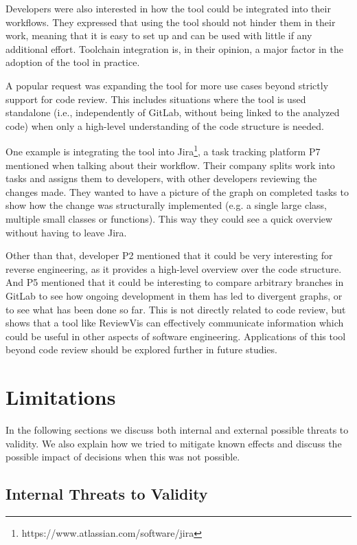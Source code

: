 \documentclass[a4paper,11pt,twoside]{article}
\theoremstyle{definition} %
\begin{document}
Developers were also interested in how the tool could be integrated into their workflows. They expressed that using the tool should not hinder them in their work, meaning that it is easy to set up and can be used with little if any additional effort. Toolchain integration is, in their opinion, a major factor in the adoption of the tool in practice.

A popular request was expanding the tool for more use cases beyond strictly support for code review. This includes situations where the tool is used standalone (i.e., independently of GitLab, without being linked to the analyzed code) when only a high-level understanding of the code structure is needed.

One example is integrating the tool into Jira\footnote{https://www.atlassian.com/software/jira}, a task tracking platform P7 mentioned when talking about their workflow. Their company splits work into tasks and assigns them to developers, with other developers reviewing the changes made. They wanted to have a picture of the graph on completed tasks to show how the change was structurally implemented (e.g. a single large class, multiple small classes or functions). This way they could see a quick overview without having to leave Jira.

Other than that, developer P2 mentioned that it could be very interesting for reverse engineering, as it provides a high-level overview over the code structure. And P5 mentioned that it could be interesting to compare arbitrary branches in GitLab to see how ongoing development in them has led to divergent graphs, or to see what has been done so far. This is not directly related to code review, but shows that a tool like ReviewVis can effectively communicate information which could be useful in other aspects of software engineering. Applications of this tool beyond code review should be explored further in future studies. 

\newpage


\section{Limitations} \label{Sec:ThreatsValidity}

In the following sections we discuss both internal and external possible threats to validity. We also explain how we tried to mitigate known effects and discuss the possible impact of decisions when this was not possible.


\subsection{Internal Threats to Validity} \label{SubSecr:InternalThreatsValidity}
\end{document}
